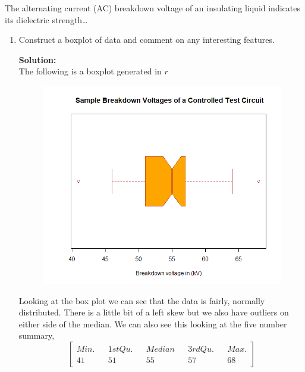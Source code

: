 \documentclass[12pt]{article}
\makeatletter
\theoremstyle{homework}
\newenvironment{exercise}[1]
{\def\@currentlabel{#1}\exercisecore}
{\endexercisecore}
\newcommand{\localhead}[1]{\par\smallskip\noindent\textbf{#1}\nobreak\\}%
\newcommand\solution{\localhead{Solution:}}
\makeatother
\begin{document}
\begin{exercise}{7.16} The  alternating  current  (AC)  breakdown  voltage  of  an  insulating  liquid  indicates  its
dielectric  strength\dots\\
\begin{enumerate}
  \item Construct a boxplot of data and comment on any interesting features.\\
  \solution The following is a boxplot generated in $r$
  \begin{figure}[H]
    \includegraphics[width = .75\textwidth]{Voltages.png}  
    \centering
  \end{figure}
  Looking at the box plot we can see that the data is fairly, normally distributed. There is a little bit of a left skew
  but we also have outliers on either side of the median. We can also see this looking at the five number summary,
  \begin{equation*}
  \begin{bmatrix}
    Min. && 1st Qu. && Median && 3rd Qu. && Max.\\ 
    41 && 51 && 55 && 57 && 68
  \end{bmatrix}
  \end{equation*}
  \vspace{.25in}


\end{enumerate}
\end{exercise}
\end{document}
